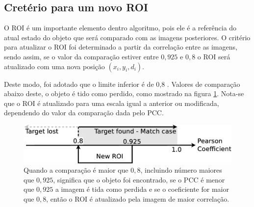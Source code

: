 \subsection{Cretério para um novo ROI}

O ROI é um importante elemento dentro algoritmo, pois ele é a referência do
atual estado do objeto que será comparado com as imagens posteriores.
O critério para atualizar o ROI foi determinado a partir da correlação 
entre as imagens, sendo assim, se o valor da comparação estiver entre $0,925$ 
e $0,8$ o ROI será atualizado com uma nova posição $(x_i,y_i,d_i)$.

Deste modo, foi adotado que o limite inferior é de 0,8 \cite{Eugene}. Valores
de comparação abaixo deste, o objeto é tido como perdido, como mostrado na figura
\ref{fig:newroicri}.
Nota-se que o ROI é atualizado para uma escala igual a anterior ou modificada,
dependendo do valor da comparação dada pelo PCC.


\begin{figure}[H]
\includegraphics[width=\columnwidth]{images/figure3.eps}
\caption{Quando a comparação é maior que $0,8$, incluindo número maiores que $0,925$, significa que o objeto foi encontrado,
se o PCC é menor que $0,925$ a imagem é tida como perdida e se o coeficiente for maior que $0,8$, então o ROI é atualizado pela imagem de 
maior correlação.}
\label{fig:newroicri}
\end{figure}

